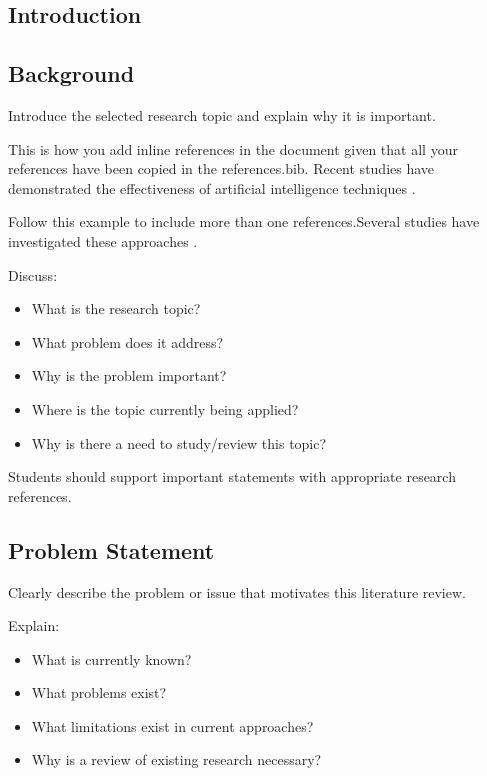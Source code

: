 \documentclass[12pt,a4paper]{article}
\begin{document}
\begin{justify}


\section{Introduction}

\subsection{Background}

Introduce the selected research topic and explain why it is important.

This is how you add inline references in the document given that all your references have been copied in the references.bib.
Recent studies have demonstrated the effectiveness of artificial
intelligence techniques \parencite{smith2024}.

Follow this example to include more than one references.Several studies have investigated these approaches
\parencite{smith2024,lee2023,ahmad2022}.

\vspace{0.5cm}
Discuss:

\begin{itemize}
    \item What is the research topic?
    \item What problem does it address?
    \item Why is the problem important?
    \item Where is the topic currently being applied?
    \item Why is there a need to study/review this topic?
\end{itemize}

Students should support important statements with appropriate research references.


\subsection{Problem Statement}

Clearly describe the problem or issue that motivates this literature review.

\vspace{0.5cm}
Explain:

\begin{itemize}
    \item What is currently known?
    \item What problems exist?
    \item What limitations exist in current approaches?
    \item Why is a review of existing research necessary?
\end{itemize}



\end{justify}
\end{document}
